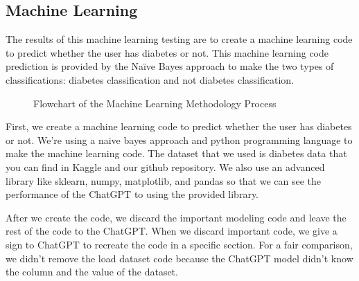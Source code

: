 \documentclass[conference]{IEEEtran}
\begin{document}
\subsection{Machine Learning}
The results of this machine learning testing are to create a machine learning code to predict whether the user has diabetes or not. This machine learning code prediction is provided by the Naïve Bayes approach to make the two types of classifications: diabetes classification and not diabetes classification.

\begin{figure}[H]
    \centering
    \caption{Flowchart of the Machine Learning Methodology Process}
\end{figure}

First, we create a machine learning code to predict whether the user has diabetes or not. We're using a naive bayes approach and python programming language to make the machine learning code. The dataset that we used is diabetes data that you can find in Kaggle and our github repository. We also use an advanced library like sklearn, numpy, matplotlib, and pandas so that we can see the performance of the ChatGPT to using the provided library.

After we create the code, we discard the important modeling code and leave the rest of the code to the ChatGPT. When we discard important code, we give a sign to ChatGPT to recreate the code in a specific section. For a fair comparison, we didn't remove the load dataset code because the ChatGPT model didn't know the column and the value of the dataset.


\end{document}
